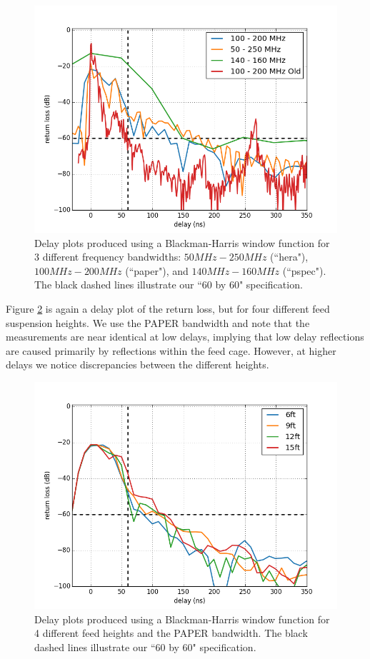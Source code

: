 \documentclass[12pt,preprint]{aastex}
\begin{document}
\begin{figure}
\centering
\includegraphics[totalheight=0.4\textheight]{plots/delay3_window.png}
\caption{Delay plots produced using a Blackman-Harris window function for 3 different frequency bandwidths: $50MHz-250MHz$ (``hera"), $100MHz-200MHz$ (``paper"), and $140MHz-160MHz$ (``pspec"). The black dashed lines illustrate our ``60 by 60" specification.}
\label{fig:3bands}
\end{figure}

Figure \ref{fig:elevator} is again a delay plot of the return loss, but for four different feed suspension heights. We use the PAPER bandwidth and note that the measurements are near identical at low delays, implying that low delay reflections are caused primarily by reflections within the feed cage. However, at higher delays we notice discrepancies between the different heights.

\begin{figure}
\centering
\includegraphics[totalheight=0.4\textheight]{plots/delay_heights_paper.png}
\caption{Delay plots produced using a Blackman-Harris window function for 4 different feed heights and the PAPER bandwidth. The black dashed lines illustrate our ``60 by 60" specification.}
\label{fig:elevator}
\end{figure}
\end{document}
